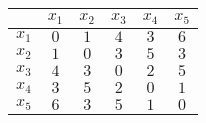 \begin{table}[h!]    
  \centering
  \begin{tabular}[12pt]{|c|c|c|c|c|c|}
\hline
& $x_1$ & $x_2$ & $x_3$ & $x_4$ & $x_5$ \\
\hline
$x_1$ & $0$ & $1$ & $4$ & $3$ & $6$ \\
\hline
$x_2$ & $1$ & $0$ & $3$ & $5$ & $3$ \\
\hline
$x_3$ & $4$ & $3$ & $0$ & $2$ & $5 $\\
\hline
$x_4$ & $3$ & $5$ & $2$ & $0$ & $1$ \\
\hline
$x_5$ & $6$ & $3$ & $5$ & $1$ & $0$ \\
\hline


\end{tabular}
\end{table}

